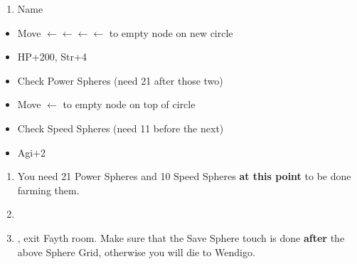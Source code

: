 \begin{enumerate}[resume]
    \item Name \shiva
\end{enumerate}
\begin{spheregrid}
    \begin{itemize}
        \tidusf
        \begin{itemize}
            \item Move $\leftarrow\leftarrow\leftarrow\leftarrow$ to empty node on new circle
            \item HP+200, Str+4
            \item Check Power Spheres (need 21 after those two)
            \item Move $\leftarrow$ to empty node on top of circle
            \item Check Speed Spheres (need 11 before the next)
            \item Agi+2
        \end{itemize}
    \end{itemize}
\end{spheregrid}
\begin{enumerate}[resume]
    \item You need 21 Power Spheres and 10 Speed Spheres \textbf{at this point} to be done farming them.
    \item \formation{\rikku}{\tidus}{\kimahri}
    \item \save, exit Fayth room. Make sure that the Save Sphere touch is done \textbf{after} the above Sphere Grid, otherwise you will die to Wendigo.
\end{enumerate}
